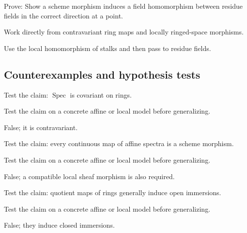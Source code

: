 \begin{exercise}\label{exr:vi19-expand-09}
Prove: Show a scheme morphism induces a field homomorphism between residue fields in the correct direction at a point.
\end{exercise}
\begin{hint}
Work directly from contravariant ring maps and locally ringed-space morphisms.
\end{hint}
\begin{solution}
Use the local homomorphism of stalks and then pass to residue fields.
\end{solution}

\subsection*{Counterexamples and hypothesis tests}

\begin{exercise}[Covariant]\label{exr:vi19-expand-10}
Test the claim: $\operatorname{Spec}$ is covariant on rings.
\end{exercise}
\begin{hint}
Test the claim on a concrete affine or local model before generalizing.
\end{hint}
\begin{solution}
False; it is contravariant.
\end{solution}

\begin{exercise}\label{exr:vi19-expand-11}
Test the claim: every continuous map of affine spectra is a scheme morphism.
\end{exercise}
\begin{hint}
Test the claim on a concrete affine or local model before generalizing.
\end{hint}
\begin{solution}
False; a compatible local sheaf morphism is also required.
\end{solution}

\begin{exercise}\label{exr:vi19-expand-12}
Test the claim: quotient maps of rings generally induce open immersions.
\end{exercise}
\begin{hint}
Test the claim on a concrete affine or local model before generalizing.
\end{hint}
\begin{solution}
False; they induce closed immersions.
\end{solution}

